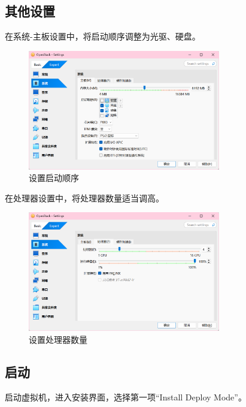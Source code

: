 \documentclass{article}
\begin{document}
\subsection{其他设置}

在系统-主板设置中，将启动顺序调整为光驱、硬盘。

\begin{figure}[H]
    \centering
    \includegraphics[width=0.75\textwidth]{img/5.1.png}
    \caption{设置启动顺序}
\end{figure}

在处理器设置中，将处理器数量适当调高。

\begin{figure}[H]
    \centering
    \includegraphics[width=0.75\textwidth]{img/5.2.png}
    \caption{设置处理器数量}
\end{figure}

\subsection{启动}

启动虚拟机，进入安装界面，选择第一项``Install Deploy Mode''。
\end{document}
